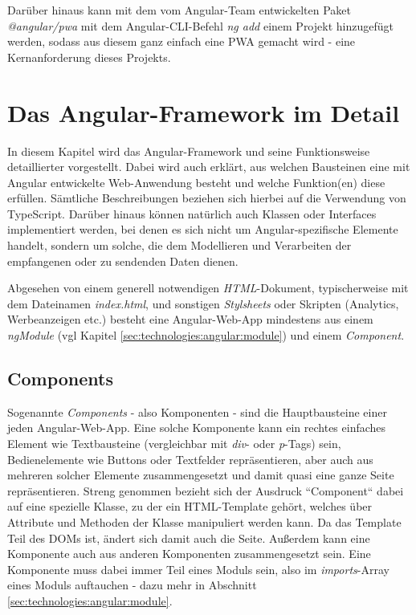 Darüber hinaus kann mit dem vom Angular-Team entwickelten Paket \textit{@angular/pwa} mit dem Angular-\acs{CLI}-Befehl \textit{ng add} einem Projekt hinzugefügt werden, sodass aus diesem ganz einfach eine \acl{PWA} gemacht wird - eine Kernanforderung dieses Projekts.

\section{Das Angular-Framework im Detail}
\label{sec:technologies:angular}

In diesem Kapitel wird das Angular-Framework und seine Funktionsweise detaillierter vorgestellt. Dabei wird auch erklärt, aus welchen Bausteinen eine mit Angular entwickelte Web-Anwendung besteht und welche Funktion(en) diese erfüllen. Sämtliche Beschreibungen beziehen sich hierbei auf die Verwendung von TypeScript. Darüber hinaus können natürlich auch Klassen oder Interfaces implementiert werden, bei denen es sich nicht um Angular-spezifische Elemente handelt, sondern um solche, die dem Modellieren und Verarbeiten der empfangenen oder zu sendenden Daten dienen.

Abgesehen von einem generell notwendigen \textit{HTML}-Dokument, typischerweise mit dem Dateinamen \textit{index.html}, und sonstigen \textit{Stylsheets} oder Skripten (Analytics, Werbeanzeigen etc.) besteht eine Angular-Web-App mindestens aus einem \textit{ngModule} (vgl Kapitel \ref{sec:technologies:angular:module}) und einem \textit{Component}.


\subsection{Components}
\label{sec:technologies:angular:component}
Sogenannte \textit{Components} - also Komponenten - sind die Hauptbausteine einer jeden Angular-Web-App. Eine solche Komponente kann ein rechtes einfaches Element wie Textbausteine (vergleichbar mit \textit{div}- oder \textit{p}-Tags) sein, Bedienelemente wie Buttons oder Textfelder repräsentieren, aber auch aus mehreren solcher Elemente zusammengesetzt und damit quasi eine ganze Seite repräsentieren. Streng genommen bezieht sich der Ausdruck ``Component`` dabei auf eine spezielle Klasse, zu der ein \acs{HTML}-Template gehört, welches über Attribute und Methoden der Klasse manipuliert werden kann. Da das Template Teil des \acsp{DOM} ist, ändert sich damit auch die Seite. Außerdem kann eine Komponente auch aus anderen Komponenten zusammengesetzt sein. Eine Komponente muss dabei immer Teil eines Moduls sein, also im \textit{imports}-Array eines Moduls auftauchen - dazu mehr in Abschnitt \ref{sec:technologies:angular:module}.

